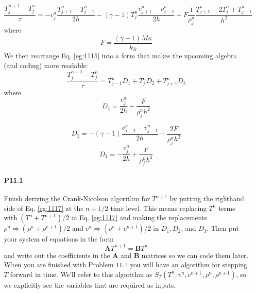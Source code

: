 \documentclass{book}
\theoremstyle{plain}
\theoremstyle{definition}
\numberwithin{exm}{chapter}
\theoremstyle{remark}
\theoremstyle{summary}
\theoremstyle{overview}
\begin{document}
\begin{equation}\label{eq:1115}
\frac{T_{j}^{n+1}-T_{j}^{n}}{\tau}=-v_{j}^{n} \frac{T_{j+1}^{n}-T_{j-1}^{n}}{2 h}-(\gamma-1) T_{j}^{n} \frac{v_{j+1}^{n}-v_{j-1}^{n}}{2 h}+F \frac{1}{\rho_{j}^{n}} \frac{T_{j+1}^{n}-2 T_{j}^{n}+T_{j-1}^{n}}{h^{2}}
\end{equation}
where
\begin{equation}\label{eq:1116}
F=\frac{(\gamma-1) M \kappa}{k_{B}}
\end{equation}
We then rearrange Eq. \eqref{eg:1115} into a form that makes the upcoming algebra (and
coding) more readable:
\begin{equation}\label{eq:1117}
\frac{T_{j}^{n+1}-T_{j}^{n}}{\tau}=T_{j-1}^{n} D_{1}+T_{j}^{n} D_{2}+T_{j+1}^{n} D_{3}
\end{equation}
where
\begin{equation}\label{eq:1118}
D_{1}=\frac{v_{j}^{n}}{2 h}+\frac{F}{\rho_{j}^{n} h^{2}}
\end{equation}

\begin{equation}\label{eq:1119}
D_{2}=-(\gamma-1) \frac{v_{j+1}^{n}-v_{j-1}^{n}}{2 h}-\frac{2 F}{\rho_{j}^{n} h^{2}}
\end{equation}
\begin{equation}\label{eq:1120}
D_{3}=-\frac{v_{j}^{n}}{2 h}+\frac{F}{\rho_{j}^{n} h^{2}}
\end{equation}
\paragraph*{P11.1}
Finish deriving the Crank-Nicolson algorithm for $T^{n+1}$ by putting the righthand side of Eq. \eqref{eg:1117} at the $n+1 / 2$ time level. This means replacing $T^{n}$ terms with $\left(T^{n}+T^{n+1}\right) / 2$ in Eq. \eqref{eg:1117} and making the replacements $\rho^{n} \Rightarrow\left(\rho^{n}+\rho^{n+1}\right) / 2$ and $v^{n} \Rightarrow\left(v^{n}+v^{n+1}\right) / 2$ in $D_{1}, D_{2}$, and $D_{3}$. Then put your system of equations in the form
\begin{equation*}
\mathbf{A} T^{n+1}=\mathbf{B} T^{n}
\end{equation*}
and write out the coefficients in the $\mathbf{A}$ and $\mathbf{B}$ matrices so we can code them later.
When you are finished with Problem $11.1$ you will have an algorithm for stepping $T$ forward in time. We'll refer to this algorithm as $S_{T}\left(T^{n}, v^{n}, v^{n+1}, \rho^{n}, \rho^{n+1}\right)$, so we explicitly see the variables that are required as inputs.
\end{document}

